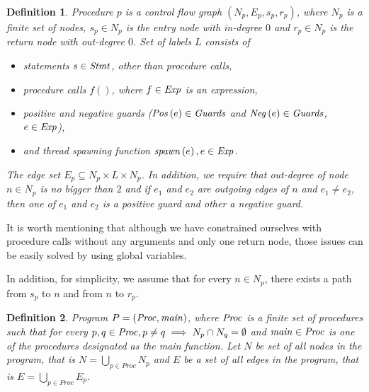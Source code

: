 \documentclass[..thesis.tex]{subfiles}
\newtheorem{defin}{Definition}[section]
\begin{document}
\begin{defin}
Procedure $p$ is a \textit{control flow graph} $\left( N_p,E_p,s_p,r_p \right)$, where $N_p$ is a finite set of nodes, $s_p \in N_p$
is the \textit{entry} node with in-degree $0$ and  $r_p \in N_p$ is the \textit{return} node with out-degree $0$. Set of labels $L$ consists of
\begin{itemize}
\item statements $s \in \mathit{Stmt}$, other than procedure calls,
\item procedure calls $f()$, where $f \in \mathit{Exp}$ is an expression, 
\item positive and negative guards ($\mathit{Pos} \left( e \right) \in \mathit{Guards}$ and $\mathit{Neg} \left( e \right) \in \mathit{Guards}$, $e \in \mathit{Exp}$),
\item and thread spawning function $\mathit{spawn} \left( e \right), e \in \mathit{Exp}$.  
\end{itemize}
The edge set  $E_p \subseteq N_p \times L \times N_p$. In addition, we require that out-degree of node $n \in N_p$ is no bigger than $2$ 
and if $e_1$ and $e_2$ are outgoing edges of $n$ and $e_1 \neq e_2$, then one of $e_1$ and $e_2$ is a positive guard and other a negative guard. 
\end{defin}

It is worth mentioning that although we have constrained ourselves with procedure calls without any arguments and only one return node,
 those issues can be easily solved by using global variables. 

In addition, for simplicity,  we assume that for every $n \in N_p$, there exists a path from $s_p$ to $n$ and from $n$ to $r_p$.

\begin{defin}
Program $P = \left( \mathit{Proc}, \mathit{main} \right)$, where $\mathit{Proc}$ is a finite set of procedures such that for every
$p,q \in \mathit{Proc}, p \neq q \implies N_p \cap N_q = \emptyset$ 
and $\mathit{main} \in \mathit{Proc}$ is one of the procedures designated as the main function.
 Let $N$ be set of all nodes in the program, that is $N = \bigcup_{p \in Proc}N_p$ and $E$ be a set of all edges in the program, that is $E = \bigcup_{p \in Proc}E_p$. 
\end{defin}
\end{document}
